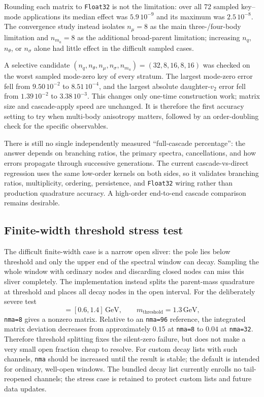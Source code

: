 \documentclass[11pt]{article}
\begin{document}
Rounding each matrix to \texttt{Float32} is not the limitation: over all 72
sampled key--mode applications its median effect was $5.9\,10^{-9}$ and its
maximum was $2.5\,10^{-8}$.  The convergence study instead isolates
$n_\mu=8$ as the main three-/four-body limitation and $n_{m_a}=8$ as the
additional broad-parent limitation; increasing $n_q$, $n_\theta$, or
$n_\sigma$ alone had little effect in the difficult sampled cases.

A selective candidate
$(n_q,n_\theta,n_\mu,n_\sigma,n_{m_a})=(32,8,16,8,16)$ was checked on the
worst sampled mode-zero key of every stratum.  The largest mode-zero error
fell from $9.50\,10^{-2}$ to $8.51\,10^{-4}$, and the largest absolute
daughter-$v_2$ error fell from $1.39\,10^{-2}$ to $3.38\,10^{-3}$.
This changes only one-time construction work; matrix size and cascade-apply
speed are unchanged.  It is therefore the first accuracy setting to try when
multi-body anisotropy matters, followed by an order-doubling check for the
specific observables.

There is still no single independently measured ``full-cascade percentage'':
the answer depends on branching ratios, the primary spectra, cancellations,
and how errors propagate through successive generations.  The current
cascade-vs-direct regression uses the same low-order kernels on both sides,
so it validates branching ratios, multiplicity, ordering, persistence, and
\texttt{Float32} wiring rather than production quadrature accuracy.  A
high-order end-to-end cascade comparison remains desirable.

\subsection{Finite-width threshold stress test}

The difficult finite-width case is a narrow open sliver: the pole lies below
threshold and only the upper end of the spectral window can decay.  Sampling
the whole window with ordinary nodes and discarding closed nodes can miss this
sliver completely.  The implementation instead splits the parent-mass
quadrature at threshold and places all decay nodes in the open interval.  For
the deliberately severe test
\begin{equation}
 [m_{\min},m_{\max}]=[0.6,1.4]\,\mathrm{GeV},\qquad
 m_{\mathrm{threshold}}=1.3\,\mathrm{GeV},
\end{equation}
\texttt{nma=8} gives a nonzero matrix.  Relative to an
\texttt{nma=96} reference, the integrated matrix deviation decreases from
approximately $0.15$ at \texttt{nma=8} to $0.04$ at \texttt{nma=32}.
Therefore threshold splitting fixes the silent-zero failure, but does not make
a very small open fraction cheap to resolve.  For custom decay lists with such
channels, \texttt{nma} should be increased until the result is stable; the
default is intended for ordinary, well-open windows.  The bundled decay list
currently enrolls no tail-reopened channels; the stress case is retained to
protect custom lists and future data updates.
\end{document}
